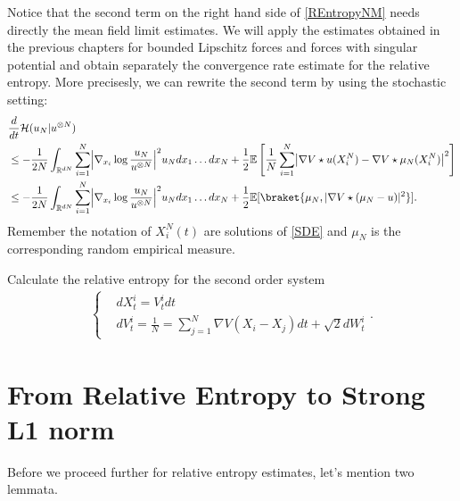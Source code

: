 Notice that the second term on the right hand side of \autoref{REntropyNM} needs directly the mean field limit estimates. We will apply the estimates obtained in the previous chapters for bounded Lipschitz forces and forces with singular potential and obtain separately the convergence rate estimate for the relative entropy.
More precisesly, we can rewrite the second term by using the stochastic setting:
\begin{align}\label{ReE}
  &\frac{d}{dt} \mathcal{H}(u_{N} | u^{\otimes N}  ) \\
 \nonumber &\leq  -\frac{1}{2N} \int_{\mathbb{R}^{dN} } \sum_{i=1}^{N} \abs*{\nabla_{x_i} \log  \frac{u_N}{u^{\otimes N} }}^2 u_N  dx_{1}\ldots dx_N+ \frac{1}{2} \E\left[\frac{1}{N} \sum_{i=1}^{N} \abs*{\nabla V \star  u(X^N_i)-\nabla V \star  \mu_N(X^N_i)}^2 \right]\\
 \nonumber &\leq  -\frac{1}{2N} \int_{\mathbb{R}^{dN} } \sum_{i=1}^{N} \abs*{\nabla_{x_i} \log  \frac{u_N}{u^{\otimes N} }}^2 u_N  dx_{1}\ldots dx_N+ \frac{1}{2} \E[\braket{\mu_N , \abs{\nabla V \star (\mu_N - u)}^2}]
.\end{align}
Remember the notation of $X^N_i(t)$ are solutions of \eqref{SDE} and $\mu_N$ is the corresponding random empirical measure.

\begin{exercise}
	Calculate the relative entropy for the second order system 
	\begin{align*}
	\begin{cases}
	&dX_t^i = V_t^i dt\\
	&dV_t^i = \frac{1}{N} = \sum_{j=1}^{N} \nabla V(X_i-X_j)  dt + \sqrt{2}dW_t^i 
	\end{cases}
	.\end{align*}
\end{exercise}

\section{From Relative Entropy to Strong L1 norm}

Before we proceed further for relative entropy estimates, let's mention two lemmata.

